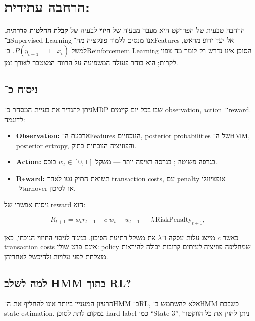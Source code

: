 \section{הרחבה עתידית: }

הרחבה טבעית של הפרויקט היא מעבר מבעיה של \textbf{חיזוי} לבעיה של \textbf{קבלת החלטות סדרתית}. ב־Supervised Learning אנו מנסים ללמוד פונקציה מה־Features אל יעד ידוע מראש, למשל \(P(y_{t+1}=1\mid x_t)\). ב־Reinforcement Learning הסוכן אינו נדרש רק לומר מה צפוי לקרות; הוא בוחר פעולה המשפיעה על הרווח המצטבר לאורך זמן.

\subsection{ניסוח כ־}

ניתן להגדיר את בעיית המסחר כ־MDP שבו בכל יום קיימים observation, action ו־reward. לדוגמה:

\begin{itemize}
    \item \textbf{Observation:} ארבעת ה־Features הנוכחיים, posterior probabilities של ה־HMM, posterior entropy, והפוזיציה הנוכחית בתיק.
    \item \textbf{Action:} בגרסה פשוטה ; בגרסה רציפה יותר — משקל \(w_t\in[0,1]\) בנכס.
    \item \textbf{Reward:} תשואת התיק נטו לאחר transaction costs, עם penalty אופציונלי ל־turnover או לסיכון.
\end{itemize}

ניסוח אפשרי של reward הוא:

\begin{equation}
R_{t+1}=w_t r_{t+1}-c\lvert w_t-w_{t-1}\rvert-\lambda\,\mathrm{RiskPenalty}_{t+1},
\end{equation}

כאשר \(c\) מייצג עלות עסקה ו־\(\lambda\) את משקל רתיעת הסיכון. בניגוד לניסוי החיזוי הנוכחי, כאן transaction costs אינם פרט שולי: policy שמחליפה פוזיציה לעיתים קרובות יכולה להיראות מוצלחת לפני עלויות ולהיכשל לאחריהן.

\subsection{למה לשלב HMM בתוך RL?}

הרעיון המעניין ביותר אינו להחליף את ה־HMM ב־RL, אלא להשתמש ב־HMM כשכבת state estimation. במקום לתת לסוכן hard label כמו ``State 3'', ניתן להזין את כל הווקטור

